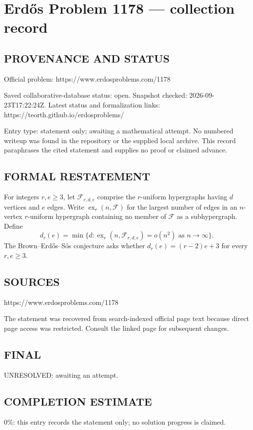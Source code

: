\section*{Erd\H{o}s Problem 1178 --- collection record}

\subsection*{PROVENANCE AND STATUS}
Official problem: https://www.erdosproblems.com/1178

Saved collaborative-database status: open.
Snapshot checked: 2026-09-23T17:22:24Z.
Latest status and formalization links: https://teorth.github.io/erdosproblems/

Entry type: statement only; awaiting a mathematical attempt. No numbered writeup was found in the repository or the supplied local archive. This record paraphrases the cited statement and supplies no proof or claimed advance.

\subsection*{FORMAL RESTATEMENT}
For integers $r,e\geq3$, let $\mathcal F_{r,d,e}$ comprise the $r$-uniform hypergraphs having $d$ vertices and $e$ edges. Write $\operatorname{ex}_r(n,\mathcal F)$ for the largest number of edges in an $n$-vertex $r$-uniform hypergraph containing no member of $\mathcal F$ as a subhypergraph. Define
\[d_r(e)=\min\{d:\operatorname{ex}_r(n,\mathcal F_{r,d,e})=o(n^2)\text{ as }n\to\infty\}.\]
The Brown--Erd\H{o}s--S\'os conjecture asks whether $d_r(e)=(r-2)e+3$ for every $r,e\geq3$.

\subsection*{SOURCES}
https://www.erdosproblems.com/1178

The statement was recovered from search-indexed official page text because direct page access was restricted. Consult the linked page for subsequent changes.

\subsection*{FINAL}
UNRESOLVED: awaiting an attempt.

\subsection*{COMPLETION ESTIMATE}
$0\%$: this entry records the statement only; no solution progress is claimed.
